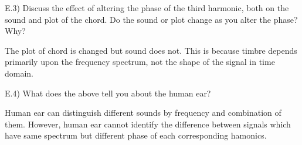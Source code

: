 \begin{tcolorbox}
  E.3) Discuss the effect of altering the phase of the third harmonic, both on the sound and plot of the chord. Do the sound or plot change as you alter the phase? Why?
\end{tcolorbox}

The plot of chord is changed but sound does not. This is because timbre depends primarily upon the frequency spectrum, not the shape of the signal in time domain.

\begin{tcolorbox}
  E.4) What does the above tell you about the human ear?
\end{tcolorbox}

Human ear can distinguish different sounds by frequency and combination of them. However, human ear cannot identify the difference between signals which have same spectrum but different phase of each corresponding hamonics.

\pagebreak